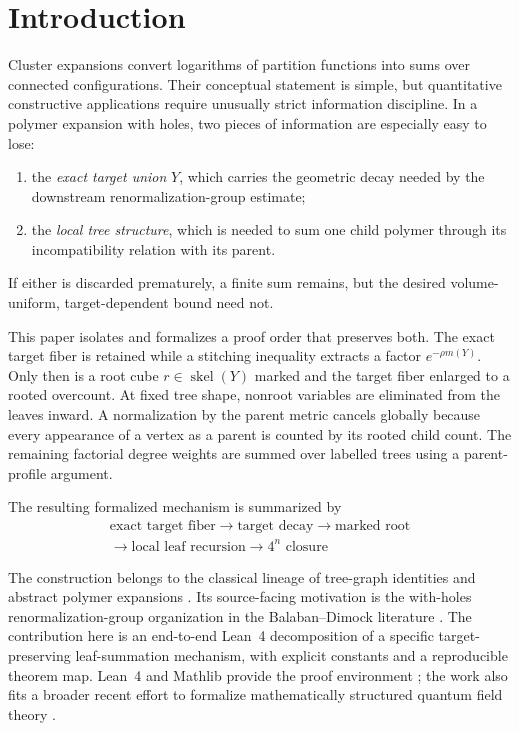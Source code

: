 \documentclass[11pt]{article}
\newcommand{\skel}{\operatorname{skel}}
\begin{document}
\section{Introduction}

Cluster expansions convert logarithms of partition functions into sums over connected configurations.  Their conceptual statement is simple, but quantitative constructive applications require unusually strict information discipline.  In a polymer expansion with holes, two pieces of information are especially easy to lose:
\begin{enumerate}[label=(\roman*),leftmargin=2.5em]
  \item the \emph{exact target union} $Y$, which carries the geometric decay needed by the downstream renormalization-group estimate;
  \item the \emph{local tree structure}, which is needed to sum one child polymer through its incompatibility relation with its parent.
\end{enumerate}
If either is discarded prematurely, a finite sum remains, but the desired volume-uniform, target-dependent bound need not.

This paper isolates and formalizes a proof order that preserves both.  The exact target fiber is retained while a stitching inequality extracts a factor $e^{-\rho m(Y)}$.  Only then is a root cube $r\in\skel(Y)$ marked and the target fiber enlarged to a rooted overcount.  At fixed tree shape, nonroot variables are eliminated from the leaves inward.  A normalization by the parent metric cancels globally because every appearance of a vertex as a parent is counted by its rooted child count.  The remaining factorial degree weights are summed over labelled trees using a parent-profile argument.

The resulting formalized mechanism is summarized by
\begin{equation}\label{eq:main-pipeline}
\boxed{\begin{gathered}
\text{exact target fiber}\to\text{target decay}\to\text{marked root}\\
\to\text{local leaf recursion}\to 4^n\text{ closure}
\end{gathered}}
\end{equation}

The construction belongs to the classical lineage of tree-graph identities and abstract polymer expansions \citep{penrose1967,kotecky1986,fernandez2007,brydges1986}.  Its source-facing motivation is the with-holes renormalization-group organization in the Balaban--Dimock literature \citep{dimock2011,dimock2012,dimock2013}.  The contribution here is an end-to-end Lean~4 decomposition of a specific target-preserving leaf-summation mechanism, with explicit constants and a reproducible theorem map.  Lean~4 and Mathlib provide the proof environment \citep{demoura2021,mathlib2020}; the work also fits a broader recent effort to formalize mathematically structured quantum field theory \citep{douglas2026}.
\end{document}
